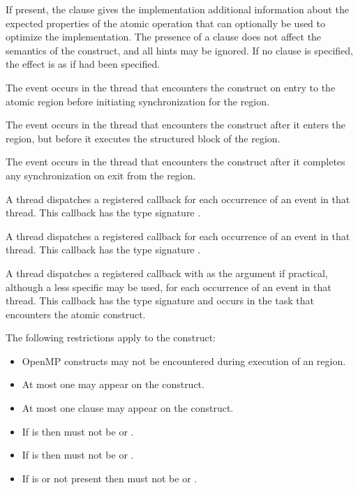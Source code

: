 If present, the  clause gives the implementation additional
information about the expected properties of the atomic operation
that can optionally be used to optimize the implementation.
The presence of a  clause does not affect the semantics of
the  construct, and all hints may be ignored. If no  
clause is specified, the effect is as if  
had been specified.

\events
The  event occurs in the thread that encounters the
 construct on entry to the atomic region before
initiating synchronization for the region.

The  event occurs in the thread that encounters the
 construct after it enters the region, but before it executes 
the structured block of the  region.

The  event occurs in the thread that encounters the
 construct after it completes any synchronization on exit 
from the  region.

\tools

A thread dispatches a registered 
callback for each occurrence of an  event
in that thread. This callback has the type signature 
.

A thread dispatches a registered 
callback for each occurrence of an  event
in that thread.  This callback has the type signature .

A thread dispatches a registered 
callback with   as the  argument if 
practical, although a less specific  may be used, for each 
occurrence of an  event in that thread.  This 
callback has the type signature  and 
occurs in the task that encounters the atomic construct.

\restrictions
The following restrictions apply to the  construct:

\begin{itemize}
\item OpenMP constructs may not be encountered during execution of an
       region.
\item At most one  may appear on the construct.
\item At most one  clause may appear on the construct.
\item If  is  then 
      must not be  or .
\item If  is  then 
      must not be  or .
\item If  is  or not present then 
       must not be  or .
\end{itemize}

